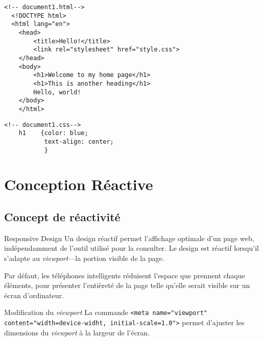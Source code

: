 \documentclass{report}
\begin{document}
\begin{ExampleDdHTML*}{}{}
  \begin{minipage}{.5\textwidth}
  \begin{lstlisting}[style=HTMLDraculaDark]  
  <!-- document1.html-->
  <!DOCTYPE html>
  <html lang="en">
	<head>
		<title>Hello!</title>
		<link rel="stylesheet" href="style.css">
	</head>
	<body>
		<h1>Welcome to my home page</h1>
		<h1>This is another heading</h1>
		Hello, world!
	</body>
	</html>
  \end{lstlisting}
  \end{minipage}

   \begin{minipage}{.5\textwidth}
	\begin{lstlisting}[style=HTMLDraculaDark]  
	<!-- document1.css-->
	h1    {color: blue;
		   text-align: center;
		   }
	\end{lstlisting}
\end{minipage}


\end{ExampleDdHTML*}
% 


\chapter{Conception Réactive}
\section{Concept de réactivité}
\begin{DefG*}{Responsive Design}
	Un design réactif permet l'affichage optimale d'un page web, indépendamment de l'outil utilisé
	pour la consulter. Le design est réactif lorsqu'il s'adapte au \textit{viewport}—la portion visible de la page. 

\end{DefG*}
\begin{note}
Par défaut, les téléphones intelligents réduisent l'espace que prennent chaque éléments, pour présenter 
l'entièreté de la page telle qu'elle serait visible sur un écran d'ordinateur. 
\end{note}



\begin{Syntaxe*}{Modification du \textit{viewport}}{}
La commande \texttt{\footnotesize{<meta name="viewport" content="width=device-widht, initial-scale=1.0">}} permet d'ajuster les dimensions du \textit{viewport} à la largeur de l'écran. 
\end{Syntaxe*}
\end{document}
